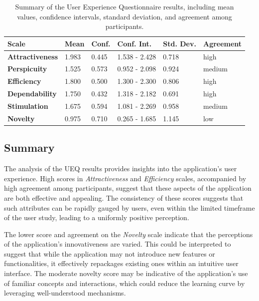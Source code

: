 \begin{table}[htb]
  \centering
  \begin{tabularx}{\textwidth}{|X|l|l|l|l|l|}
  \hline
      \textbf{Scale} &  \textbf{Mean}  &  \textbf{Conf.} &  \textbf{Conf. Int.} &  \textbf{Std. Dev.} & \textbf{Agreement}\\ \hline
      \textbf{Attractiveness} & 1.983  & 0.445 & 1.538 - 2.428 & 0.718 & high \\ \hline
      \textbf{Perspicuity} & 1.525 & 0.573 & 0.952 - 2.098 & 0.924 & medium\\ \hline
      \textbf{Efficiency} & 1.800 & 0.500 & 1.300 - 2.300 & 0.806 & high \\ \hline
      \textbf{Dependability} & 1.750 & 0.432 & 1.318 - 2.182 & 0.691 & high \\ \hline
      \textbf{Stimulation} & 1.675 & 0.594 & 1.081 - 2.269 & 0.958 & medium \\ \hline
      \textbf{Novelty} & 0.975 & 0.710 & 0.265 - 1.685 & 1.145 & low \\ \hline
  \end{tabularx}
  \vspace{6pt}
  \caption{Summary of the User Experience Questionnaire results, including mean values, confidence intervals, standard deviation, and agreement among participants.}
  \label{tab:ueq-summary}
\end{table}

\subsection*{Summary}

The analysis of the UEQ results provides insights into the application's user experience.
High scores in \emph{Attractiveness} and \emph{Efficiency} scales, accompanied by high agreement among participants, suggest that these aspects of the application are both effective and appealing.
The consistency of these scores suggests that such attributes can be rapidly gauged by users, even within the limited timeframe of the user study, leading to a uniformly positive perception.

The lower score and agreement on the \emph{Novelty} scale indicate that the perceptions of the application's innovativeness are varied.
This could be interpreted to suggest that while the application may not introduce new features or functionalities, it effectively repackages existing ones within an intuitive user interface.
The moderate novelty score may be indicative of the application's use of familiar concepts and interactions, which could reduce the learning curve by leveraging well-understood mechanisms.

